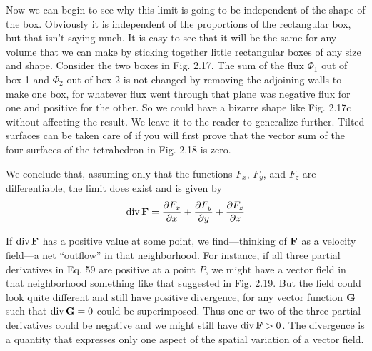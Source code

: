 Now we can begin to see why this limit is going to be independent
of the shape of the box. Obviously it is independent of the proportions
of the rectangular box, but that isn't saying much. It is easy to
see that it will be the same for any volume that we can make by sticking
together little rectangular boxes of any size and shape. Consider
the two boxes in Fig. 2.17. The sum of the flux $\Phi_1$ out of box 1 and
$\Phi_2$ out of box 2 is not changed by removing the adjoining walls to
make one box, for whatever flux went through that plane was negative
flux for one and positive for the other. So we could have a
bizarre shape like Fig. 2.17c without affecting the result. We leave it
to the reader to generalize further. Tilted surfaces can be taken care
of if you will first prove that the vector sum of the four surfaces of the
tetrahedron in Fig. 2.18 is zero.

We conclude that, assuming only that the functions $F_x$, $F_y$, and $F_z$
are differentiable, the limit does exist and is given by
\begin{equation}
  \operatorname{div}\mathbf{F} = \frac{\partial F_x}{\partial x}+\frac{\partial F_y}{\partial y}+\frac{\partial F_z}{\partial z}
\end{equation}

If $\operatorname{div}\mathbf{F}$ has a positive value at some point, we find---thinking of $\mathbf{F}$
as a velocity field---a net ``outflow'' in that neighborhood. For instance,
if all three partial derivatives in Eq. 59 are positive at a
point $P$, we might have a vector field in that neighborhood something
like that suggested in Fig. 2.19. But the field could look quite different
and still have positive divergence, for any vector function $\mathbf{G}$
such that $\operatorname{div} \mathbf{G} = 0$ could be superimposed. Thus one or two of the
three partial derivatives could be negative and we might still have
$\operatorname{div}\mathbf{F} > 0$. The divergence is a quantity that expresses only one
aspect of the spatial variation of a vector field.

